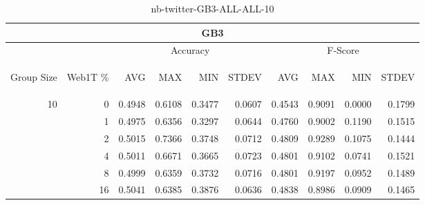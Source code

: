\begin{center}
\begin{table}[htbp]
\begin{center}
\begin{tabular}{ | r | r | r | r | r | r | r | r | r | r |}
\hline
\multicolumn{10}{|c|}{GB3}\\
\hline
 & & \multicolumn{4}{|c|}{Accuracy} & \multicolumn{4}{|c|}{F-Score}\\ \cline{3-10}
\begin{sideways}Group Size\end{sideways} & \begin{sideways}Web1T \%\end{sideways} & \begin{sideways}AVG\end{sideways} & \begin{sideways}MAX\end{sideways} & \begin{sideways}MIN\end{sideways} & \begin{sideways}STDEV\end{sideways} & \begin{sideways}AVG\end{sideways} & \begin{sideways}MAX\end{sideways} & \begin{sideways}MIN\end{sideways} & \begin{sideways}STDEV\end{sideways}\\
\hline
\multirow{5}{*}{10}
 & 0 & 0.4948 & 0.6108 & 0.3477 & 0.0607 & 0.4543 & 0.9091 & 0.0000 & 0.1799\\ \cline{2-10}
 & 1 & 0.4975 & 0.6356 & 0.3297 & 0.0644 & 0.4760 & 0.9002 & 0.1190 & 0.1515\\ \cline{2-10}
 & 2 & 0.5015 & 0.7366 & 0.3748 & 0.0712 & 0.4809 & 0.9289 & 0.1075 & 0.1444\\ \cline{2-10}
 & 4 & 0.5011 & 0.6671 & 0.3665 & 0.0723 & 0.4801 & 0.9102 & 0.0741 & 0.1521\\ \cline{2-10}
 & 8 & 0.4999 & 0.6359 & 0.3732 & 0.0716 & 0.4801 & 0.9197 & 0.0952 & 0.1489\\ \cline{2-10}
 & 16 & 0.5041 & 0.6385 & 0.3876 & 0.0636 & 0.4838 & 0.8986 & 0.0909 & 0.1465\\ \cline{2-10}
\hline
\end{tabular}
\caption{nb-twitter-GB3-ALL-ALL-10}
\label{table:nb-twitter-GB3-ALL-ALL-10}
\end{center}
\end{table}
\end{center}

